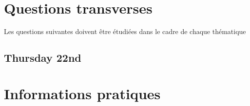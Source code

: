\documentclass[openany, parskip=full, 12pt, a4]{scrbook}
\begin{document}
\chapter{Questions transverses}

Les questions suivantes doivent être étudiées dans le cadre de chaque thématique

\begin{description}



\end{description}

\section{Thursday 22nd}

\chapter{Informations pratiques}




\newpage



\thispagestyle{empty}
\mbox{}
\end{document}
